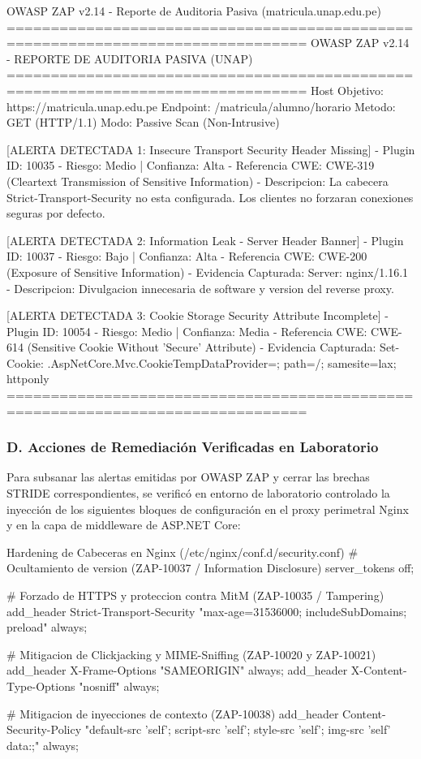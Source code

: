 \begin{cmdbox}{OWASP ZAP v2.14 - Reporte de Auditoria Pasiva (matricula.unap.edu.pe)}
================================================================================
             OWASP ZAP v2.14 - REPORTE DE AUDITORIA PASIVA (UNAP)
================================================================================
Host Objetivo: https://matricula.unap.edu.pe
Endpoint:      /matricula/alumno/horario
Metodo:        GET (HTTP/1.1)
Modo:          Passive Scan (Non-Intrusive)

[ALERTA DETECTADA 1: Insecure Transport Security Header Missing]
- Plugin ID: 10035
- Riesgo: Medio | Confianza: Alta
- Referencia CWE: CWE-319 (Cleartext Transmission of Sensitive Information)
- Descripcion: La cabecera Strict-Transport-Security no esta configurada.
  Los clientes no forzaran conexiones seguras por defecto.

[ALERTA DETECTADA 2: Information Leak - Server Header Banner]
- Plugin ID: 10037
- Riesgo: Bajo | Confianza: Alta
- Referencia CWE: CWE-200 (Exposure of Sensitive Information)
- Evidencia Capturada: Server: nginx/1.16.1
- Descripcion: Divulgacion innecesaria de software y version del reverse proxy.

[ALERTA DETECTADA 3: Cookie Storage Security Attribute Incomplete]
- Plugin ID: 10054
- Riesgo: Medio | Confianza: Media
- Referencia CWE: CWE-614 (Sensitive Cookie Without 'Secure' Attribute)
- Evidencia Capturada: Set-Cookie: .AspNetCore.Mvc.CookieTempDataProvider=; 
  path=/; samesite=lax; httponly
================================================================================
\end{cmdbox}

\subsubsection{D. Acciones de Remediación Verificadas en Laboratorio}
Para subsanar las alertas emitidas por OWASP ZAP y cerrar las brechas STRIDE correspondientes, se verificó en entorno de laboratorio controlado la inyección de los siguientes bloques de configuración en el proxy perimetral Nginx y en la capa de middleware de ASP.NET Core:

\begin{cmdbox}{Hardening de Cabeceras en Nginx (/etc/nginx/conf.d/security.conf)}
# Ocultamiento de version (ZAP-10037 / Information Disclosure)
server_tokens off;

# Forzado de HTTPS y proteccion contra MitM (ZAP-10035 / Tampering)
add_header Strict-Transport-Security "max-age=31536000; includeSubDomains; preload" always;

# Mitigacion de Clickjacking y MIME-Sniffing (ZAP-10020 y ZAP-10021)
add_header X-Frame-Options "SAMEORIGIN" always;
add_header X-Content-Type-Options "nosniff" always;

# Mitigacion de inyecciones de contexto (ZAP-10038)
add_header Content-Security-Policy "default-src 'self'; script-src 'self'; style-src 'self'; img-src 'self' data:;" always;
\end{cmdbox}

